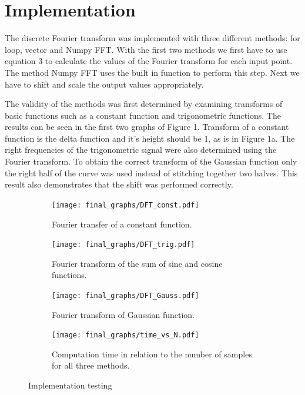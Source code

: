 \documentclass[12pt, a4paper]{article}
\begin{document}
\section{Implementation}
The discrete Fourier transform was implemented with three different methods: for loop, vector and Numpy FFT. With the first two methods we first have to use equation 3 to calculate the values of the Fourier transform for each input point. The method Numpy FFT uses the built in function to perform this step. Next we have to shift and scale the output values appropriately.

The validity of the methods was first determined by examining transforms of basic functions such as a constant function and trigonometric functions. The results can be seen in the first two graphs of Figure 1. Transform of a constant function is the delta function and it's height should be 1, as is in Figure 1a. The right frequencies of the trigonometric signal were also determined using the Fourier transform. To obtain the correct transform of the Gaussian function only the right half of the curve was used instead of stitching together two halves. This result also demonstrates that the shift was performed correctly. 

\begin{figure}[hbtp]
  \begin{subfigure}{0.5\textwidth}
  \texttt{[image: final\_graphs/DFT\_const.pdf]}
  \caption{Fourier transfer of a constant function.} \label{fig:a}
  \end{subfigure}
  \hspace*{\fill}
  \begin{subfigure}{0.5\textwidth}
  \texttt{[image: final\_graphs/DFT\_trig.pdf]}
  \caption{Fourier transform of the sum of sine and cosine functions.} \label{fig:b}
  \end{subfigure}
  \medskip
  \begin{subfigure}{0.5\textwidth}
  \texttt{[image: final\_graphs/DFT\_Gauss.pdf]}
  \caption{Fourier transform of Gaussian function.} \label{fig:c}
  \end{subfigure}
  \hspace*{\fill}
  \begin{subfigure}{0.5\textwidth}
  \texttt{[image: final\_graphs/time\_vs\_N.pdf]}
  \caption{Computation time in relation to the number of samples for all three methods.} \label{fig:d}
  \end{subfigure} 
  \caption{Implementation testing} \label{fig:1}
\end{figure}
\end{document}
